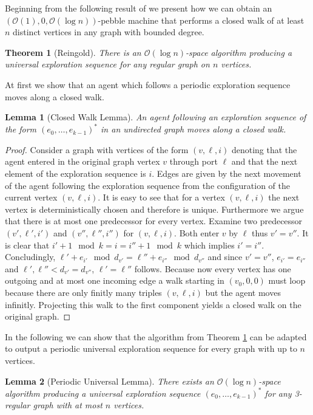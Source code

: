 \documentclass[oneside]{scrartcl}
\newtheorem{thm}{Theorem}
\newtheorem{lem}{Lemma}
\begin{document}
Beginning from the following result of \cite{logspacealg} we present how we can
obtain an $(\mathcal{O}(1),0,\mathcal{O}(\log n))$-pebble machine that performs
a closed walk of at least $n$ distinct vertices in any graph with bounded
degree.
\begin{thm}[Reingold]
  \label{thm:logalg}
  There is an $\mathcal{O}(\log n)$-space algorithm producing a universal
  exploration sequence for any regular graph on $n$ vertices.
\end{thm}
At first we show that an agent which follows a periodic exploration sequence
moves along a closed walk.
\begin{lem}[Closed Walk Lemma]
  An agent following an exploration sequence of the form
  $(e_{0},\dots,e_{k-1})^{\ast}$ in an undirected graph moves along a closed
  walk.
\end{lem}
\begin{proof}
  Consider a graph with vertices of the form $(v,\ell,i)$
  denoting that the agent entered in the original graph vertex $v$ through port
  $\ell$ and that the next element of the exploration sequence is $i$.
  Edges are given by the next movement of the agent following the exploration
  sequence from the configuration of the current vertex $(v,\ell,i)$. It is
  easy to see that for a vertex $(v,\ell,i)$
  the next vertex is deterministically chosen and therefore is unique.
  Furthermore we argue that there is at most one predecessor for every vertex.
  Examine two predecessor $(v',\ell',i')$ and $(v'',\ell'',i'')$ for
  $(v,\ell,i)$. Both enter $v$ by $\ell$ thus $v' = v''$.  It is clear that
  $i' + 1 \mod k = i = i'' + 1 \mod k$ which implies $i' = i''$. Concludingly,
  $\ell' + e_{i'} \mod d_{v'} = \ell'' + e_{i''} \mod d_{v''}$ and since
  $v' = v''$, $e_{i'} = e_{i''}$ and $\ell',\ell'' < d_{v'} = d_{v''}$,
  $\ell' = \ell''$ follows.
  Because now every vertex has one outgoing and at most one incoming edge 
  a walk starting in $(v_{0},0,0)$ must loop
  because there are only finitly many triples $(v,\ell,i)$ but the agent moves
  infinitly. Projecting this walk to the first component yields a closed walk
  on the original graph.
\end{proof}
In the following we can show that the algorithm from Theorem \ref{thm:logalg}
can be adapted to output a periodic universal exploration sequence for every
graph with up to $n$ vertices.
\begin{lem}[Periodic Universal Lemma]
  \label{lem:pul}
  There exists an $\mathcal{O}(\log n)$-space algorithm producing a universal
  exploration sequence $(e_{0},\dots,e_{k-1})^{\ast}$ for any 3-regular graph
  with at most $n$ vertices.
\end{lem}
\end{document}
